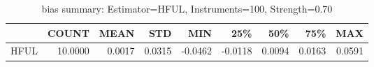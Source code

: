 \begin{table}[ht]
\centering
\caption{bias summary: Estimator=HFUL, Instruments=100, Strength=0.70}
\begin{tabular}{lrrrrrrrr}
\toprule
 & COUNT & MEAN & STD & MIN & 25\% & 50\% & 75\% & MAX \\
\midrule
HFUL & 10.0000 & 0.0017 & 0.0315 & -0.0462 & -0.0118 & 0.0094 & 0.0163 & 0.0591 \\
\bottomrule
\end{tabular}
\end{table}
